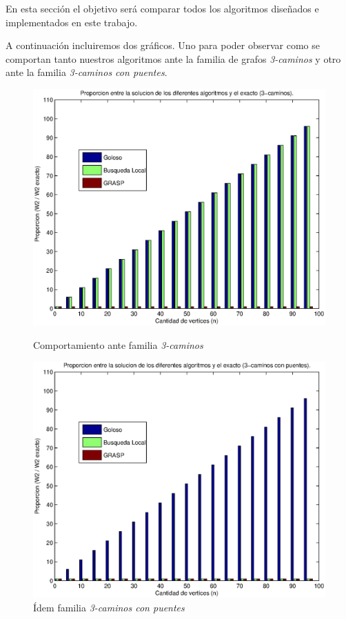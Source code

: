 En esta sección el objetivo será comparar todos los algoritmos diseñados e implementados en este trabajo.

A continuación incluiremos dos gráficos. Uno para poder observar como se comportan tanto nuestros algoritmos ante la familia de grafos \emph{3-caminos} y otro ante la familia \emph{3-caminos con puentes}.

\begin{figure}[H]
    \begin{minipage}{0.5\linewidth}
      \includegraphics[width=\linewidth]{graficos/todos_proporcion_3caminos.eps}
      \caption{Comportamiento ante familia \emph{3-caminos}}\label{fig:comportamiento-familia-rompe}
    \end{minipage}
    \hfill
    \begin{minipage}{0.5\linewidth}
      \includegraphics[width=\linewidth]{graficos/todos_proporcion_puentes.eps}
      \caption{Ídem familia \emph{3-caminos con puentes}}\label{fig:comportamiento-familia-puente}
    \end{minipage}    
\end{figure}

